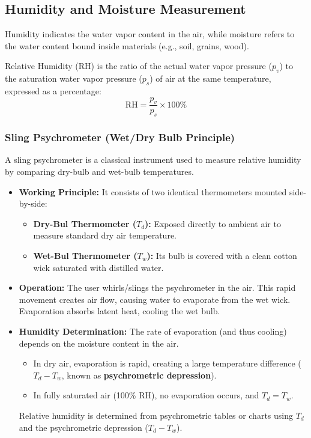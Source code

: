 \documentclass[12pt,a4paper]{article}
\begin{document}
\subsection{Humidity and Moisture Measurement}
Humidity indicates the water vapor content in the air, while moisture refers to the water content bound inside materials (e.g., soil, grains, wood).

\begin{tcolorbox}[defbox, title={\textbf{Relative Humidity (RH)}}]
Relative Humidity (RH) is the ratio of the actual water vapor pressure ($p_v$) to the saturation water vapor pressure ($p_s$) of air at the same temperature, expressed as a percentage:
\begin{equation}
  \text{RH} = \frac{p_v}{p_s} \times 100\%
\end{equation}
\end{tcolorbox}

\subsubsection{Sling Psychrometer (Wet/Dry Bulb Principle)}
A sling psychrometer is a classical instrument used to measure relative humidity by comparing dry-bulb and wet-bulb temperatures.
\begin{itemize}[leftmargin=*, itemsep=3.5pt]
  \item \textbf{Working Principle:} It consists of two identical thermometers mounted side-by-side:
    \begin{itemize}[leftmargin=*, itemsep=2.5pt, topsep=0pt]
      \item \textbf{Dry-Bul Thermometer ($T_d$):} Exposed directly to ambient air to measure standard dry air temperature.
      \item \textbf{Wet-Bul Thermometer ($T_w$):} Its bulb is covered with a clean cotton wick saturated with distilled water.
    \end{itemize}
  \item \textbf{Operation:} The user whirls/slings the psychrometer in the air. This rapid movement creates air flow, causing water to evaporate from the wet wick. Evaporation absorbs latent heat, cooling the wet bulb.
  \item \textbf{Humidity Determination:} The rate of evaporation (and thus cooling) depends on the moisture content in the air. 
    \begin{itemize}[leftmargin=*, itemsep=2.5pt, topsep=0pt]
      \item In dry air, evaporation is rapid, creating a large temperature difference ($T_d - T_w$, known as \textbf{psychrometric depression}).
      \item In fully saturated air (100\% RH), no evaporation occurs, and $T_d = T_w$.
    \end{itemize}
    Relative humidity is determined from psychrometric tables or charts using $T_d$ and the psychrometric depression ($T_d - T_w$).
\end{itemize}
\end{document}
